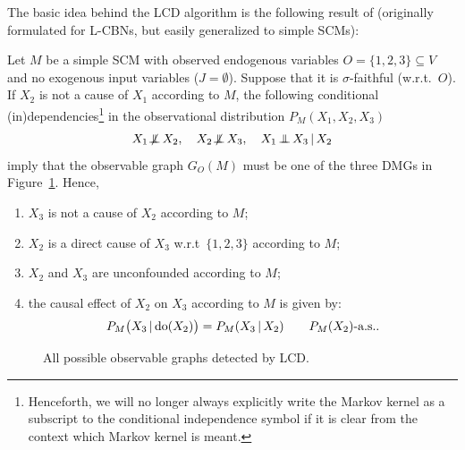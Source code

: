 The basic idea behind the LCD algorithm is the following result of \cite{Cooper1997}
(originally formulated for L-CBNs, but easily generalized to simple SCMs):
\begin{Prp}\label{prp:LCD}
  Let $M$ be a simple SCM with observed endogenous variables $O = \{1,2,3\} \subseteq V$ and no exogenous input variables ($J = \emptyset$).
  Suppose that it is $\sigma$-faithful (w.r.t.\ $O$). 
  If $X_2$ is not a cause of $X_1$ according to $M$,
  the following conditional (in)dependencies\footnote{Henceforth, we will no longer always explicitly write
  the Markov kernel as a subscript to the conditional independence symbol if it is clear
  from the context which Markov kernel is meant.} in the observational distribution $P_{M}(X_1,X_2,X_3)$
  $$X_1 \nIndep X_2, \quad X_2 \nIndep X_3, \quad X_1 \Indep X_3 \given X_2$$
  imply that the observable graph $G_O(M)$ must be one of the three DMGs in Figure~\ref{fig:LCD}. 
  Hence,
  \begin{enumerate}
  \item $X_3$ is not a cause of $X_2$ according to $M$;
  \item $X_2$ is a direct cause of $X_3$ w.r.t\ $\{1,2,3\}$ according to $M$;
  \item $X_2$ and $X_3$ are unconfounded according to $M$;
  \item the causal effect of $X_2$ on $X_3$ according to $M$ is given by:
    \begin{equation}\label{eq:LCD}
      P_{M}\big(X_3 \operatorname*{|} \operatorname{do}(X_2)\big) = P_{M}(X_3 \operatorname*{|} X_2) \qquad P_M(X_2)\text{-a.s.}.
    \end{equation}
  \end{enumerate}
\end{Prp}
\begin{figure}
  \centering
  \caption{All possible observable graphs detected by LCD.\label{fig:LCD}}
\end{figure}
